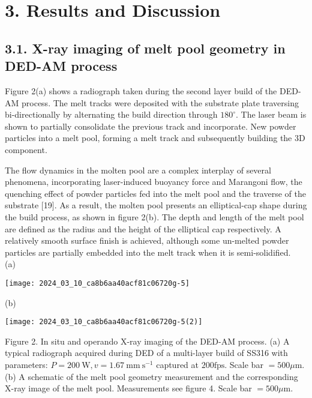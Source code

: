 \documentclass[10pt]{article}
\begin{document}
\section*{3. Results and Discussion}
\subsection*{3.1. X-ray imaging of melt pool geometry in DED-AM process}
Figure 2(a) shows a radiograph taken during the second layer build of the DED-AM process. The melt tracks were deposited with the substrate plate traversing bi-directionally by alternating the build direction through $180^{\circ}$. The laser beam is shown to partially consolidate the previous track and incorporate. New powder particles into a melt pool, forming a melt track and subsequently building the $3 \mathrm{D}$ component.

The flow dynamics in the molten pool are a complex interplay of several phenomena, incorporating laser-induced buoyancy force and Marangoni flow, the quenching effect of powder particles fed into the melt pool and the traverse of the substrate [19]. As a result, the molten pool presents an elliptical-cap shape during the build process, as shown in figure 2(b). The depth and length of the melt pool are defined as the radius and the height of the elliptical cap respectively. A relatively smooth surface finish is achieved, although some un-melted powder particles are partially embedded into the melt track when it is semi-solidified.\\
(a)

\begin{center}
\texttt{[image: 2024\_03\_10\_ca8b6aa40acf81c06720g-5]}
\end{center}

(b)

\begin{center}
\texttt{[image: 2024\_03\_10\_ca8b6aa40acf81c06720g-5(2)]}
\end{center}

Figure 2. In situ and operando X-ray imaging of the DED-AM process. (a) A typical radiograph acquired during DED of a multi-layer build of SS316 with parameters: $P=200 \mathrm{~W}, v=1.67 \mathrm{~mm} \mathrm{~s}^{-1}$ captured at $200 \mathrm{fps}$. Scale bar $=500 \mu \mathrm{m}$. (b) A schematic of the melt pool geometry measurement and the corresponding X-ray image of the melt pool. Measurements see figure 4. Scale bar $=500 \mu \mathrm{m}$.
\end{document}
